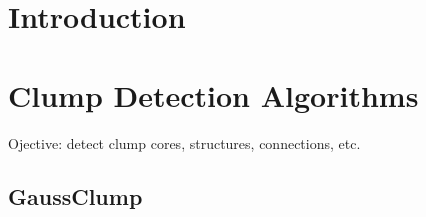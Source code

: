 \documentclass[manuscript]{aastex}
\begin{document}





\section{Introduction}

\section{Clump Detection Algorithms}

Ojective: detect clump cores, structures, connections, etc.

\subsection{GaussClump}
\end{document}
